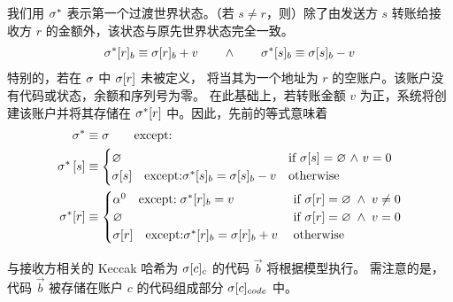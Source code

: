 我们用 $\mathbf{\sigma}^*$ 表示第一个过渡世界状态。（若 $s\ne r$，则）除了由发送方 $s$ 转账给接收方 $r$ 的金额外，该状态与原先世界状态完全一致。
\begin{align}
	\mathbf{\sigma}^*[r]_b\equiv \mathbf{\sigma}[r]_b+v \qquad \land  \qquad\mathbf{\sigma}^*[s]_b\equiv \mathbf{\sigma}[s]_b-v
	\label{state:first transitional}
\end{align}
特别的，若在 $\mathbf{\sigma}$ 中 $\mathbf{\sigma}[r]$ 未被定义， \name 将当其为一个地址为 $r$ 的空账户。该账户没有代码或状态，余额和序列号为零。
在此基础上，若转账金额 $v$ 为正，系统将创建该账户并将其存储在 $\mathbf{\sigma}^*[r]$ 中。因此，先前的等式意味着
\begin{align}
	\mathbf{\sigma}^* &\equiv \mathbf{\sigma} \qquad \mbox{except:}\\
	\mathbf{\sigma}^*\left[ s \right] &\equiv \begin{cases}
		\varnothing & \mbox{if $\mathbf{\sigma}[s]=\varnothing$ $\land$ $v=0$}\\
		\mathbf{\sigma}[s]\quad\mbox{except:}\mathbf{\sigma}^*[s]_b=\mathbf{\sigma}[s]_b-v & \mbox{otherwise}
	\end{cases}\\
	\mathbf{\sigma}^*[r] &\equiv \begin{cases}
		\mathbf{\alpha}^0 \quad\text{except:}\; \mathbf{\sigma}^*[r]_b=v  & \mbox{if $\mathbf{\sigma}[r]=\varnothing \;\land\; v\ne 0$}\\
		\varnothing & \mbox{if $\mathbf{\sigma}[r]=\varnothing \;\land\; v = 0$}\\
		\mathbf{\sigma}[r]\quad\mbox{except:}\mathbf{\sigma}^*[r]_b=\mathbf{\sigma}[r]_b+v\; & \mbox{otherwise}
	\end{cases}
\end{align}

与接收方相关的 Keccak 哈希为 $\mathbf{\sigma}[c]_c$ 的代码 $\vec{b}$ 将根据模型执行。
需注意的是，代码 $\vec{b}$ 被存储在账户 $c$ 的代码组成部分 $\mathbf{\sigma}[c]_{code}$ 中。

